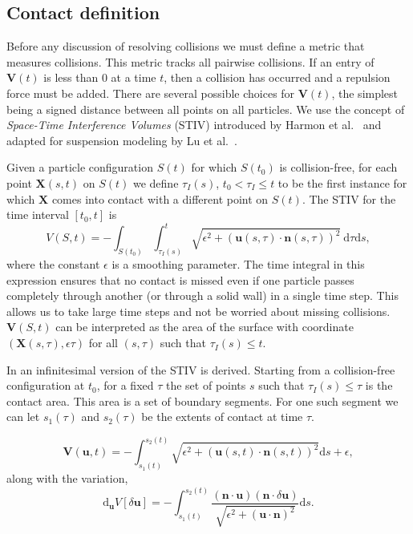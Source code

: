 \documentclass[preprint, 10pt]{elsarticle}
\begin{document}
\subsection{Contact definition}

Before any discussion of resolving collisions we must define a metric that measures collisions. This metric tracks all pairwise collisions. If an entry of $\mathbf{V}(t)$ is less than 0 at a time $t$, then a collision has occurred and a repulsion force must be added. There are several possible choices for $\mathbf{V}(t)$, the simplest being a signed distance between all points on all particles. We use the concept of \textit{Space-Time Interference Volumes} (STIV) introduced by Harmon et al.~\cite{Harmon2011} and adapted for suspension modeling by Lu et al.~\cite{Lu2017}. 

Given a particle configuration $S(t)$ for which $S(t_0)$ is collision-free, for each point $\mathbf{X}(s,t)$ on $S(t)$ we define $\tau_I(s)$, $t_0 < \tau_I \leq t$ to be the first instance for which $\mathbf{X}$ comes into contact with a different point on $S(t)$. The STIV for the time interval $[t_0, t]$ is 
\[ V(S, t) = -\int_{S(t_0)}\int_{\tau_I(s)}^t \sqrt{\epsilon^2 + (\mathbf{u}(s, \tau)\cdot\mathbf{n}(s,\tau))^2}~\text{d}\tau\text{d}s,\]
where the constant $\epsilon$ is a smoothing parameter. The time integral in this expression ensures that no contact is missed even if one particle passes completely through another (or through a solid wall) in a single time step. This allows us to take large time steps and not be worried about missing collisions. $\mathbf{V}(S,t)$ can be interpreted as the area of the surface with coordinate $(\mathbf{X}(s,\tau),\epsilon\tau)$ for all $(s,\tau)$ such that $\tau_I(s)\leq t$. 

In \cite{Lu2017} an infinitesimal version of the STIV is derived. Starting from a collision-free configuration at $t_0$, for a fixed $\tau$ the set of points $s$ such that $\tau_I(s)\leq \tau$ is the contact area. This area is a set of boundary segments. For one such segment we can let $s_1(\tau)$ and $s_2(\tau)$ be the extents of contact at time $\tau$. 

\[ \mathbf{V}(\mathbf{u},t) = -\int_{s_1(t)}^{s_2(t)} \sqrt{\epsilon^2 + (\mathbf{u}(s,t)\cdot\mathbf{n}(s,t))^2}\text{d}s + \epsilon,\]
along with the variation, 
\[ \text{d}_{\mathbf{u}}V[\delta\mathbf{u}] = -\int_{s_1(t)}^{s_2(t)}\frac{(\mathbf{n}\cdot\mathbf{u})(\mathbf{n}\cdot\delta\mathbf{u})}{\sqrt{\epsilon^2 + (\mathbf{u}\cdot\mathbf{n})^2}}\text{d}s.\]
\end{document}
